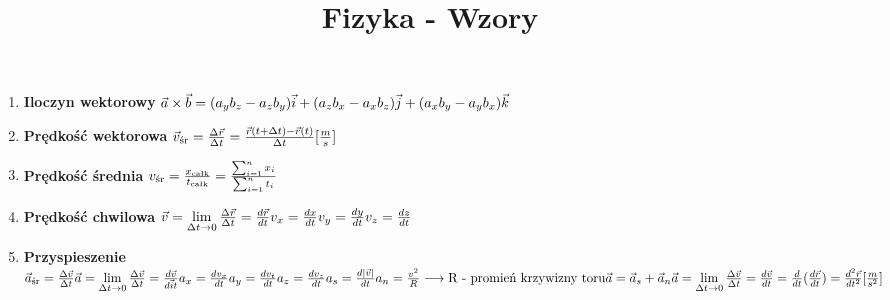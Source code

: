 \documentclass{article}
\author{}
\title{Fizyka - Wzory}
\date{}
\begin{document}
	\maketitle

	\begin{enumerate}
		\item \textbf{Iloczyn wektorowy} $ \newline
		 \vec{a} \times \vec{b} = (a_yb_z - a_zb_y)\vec{i} + (a_zb_x - a_xb_z)\vec{j} + (a_xb_y - a_yb_x)\vec{k}
		 $
		\item \textbf{Prędkość wektorowa} $ \newline
		\vec{v}_\text{śr} = \frac{\Delta\vec{r}}{\Delta t} = \frac{\vec{r}(t + \Delta t) - \vec{r}(t)}{\Delta t}  [\frac{m}{s}]
		$
		
		\item \textbf{Prędkość średnia} $ \newline
		v_\text{śr} = \frac{x_\text{całk}}{t_\text{całk}} = \frac{\sum_{i=1}^{n}x_i}{\sum_{i=1}^{n}t_i}
		$
		
		\item \textbf{Prędkość chwilowa} $ \newline
		\vec{v} = \lim\limits_{\Delta t \rightarrow 0} \frac{\Delta \vec{r}}{\Delta t} = \frac{d \vec{r}}{dt}
		\newline
		v_x = \frac{dx}{dt}
		\newline
		v_y = \frac{dy}{dt}
		\newline
		v_z = \frac{dz}{dt}
		$
		
		\item \textbf{Przyspieszenie} $ \newline
		\vec{a}_\text{śr} = \frac{\Delta \vec{v}}{\Delta t} 
		\newline
		\vec{a} = \lim\limits_{\Delta t \rightarrow 0} \frac{\Delta \vec{v}}{\Delta t} = \frac{d \vec{v}}{d \vec{i}t}
		\newline
		a_x = \frac{dv_x}{dt}
		\newline
		a_y = \frac{dv_t}{dt}
		\newline
		a_z = \frac{dv_z}{dt} 
		\newline
		a_s = \frac{d |\vec{v}|}{dt}
		\newline
		a_n = \frac{v^2}{R} \longrightarrow \text{R - promień krzywizny toru}
		\newline
		\vec{a} = \vec{a}_s + \vec{a}_n 
		\newline
		\vec{a} = \lim\limits_{\Delta t \rightarrow 0} \frac{\Delta \vec{v}}{\Delta t} = \frac{d \vec{v}}{dt} = \frac{d}{dt} (\frac{d \vec{r}}{dt}) = \frac{d^2 \vec{r}}{dt^2} [\frac{m}{s^2}]
		$
		

\end{enumerate}
\end{document}
